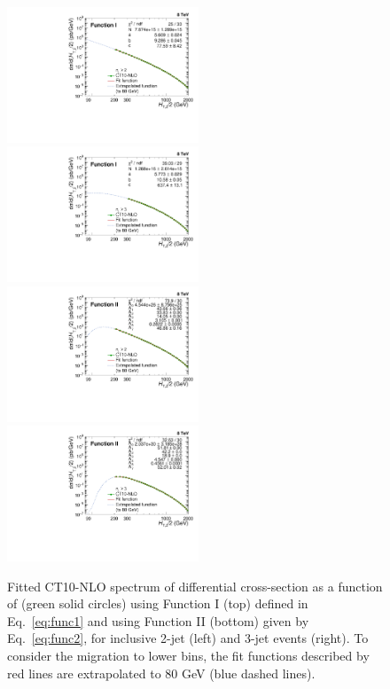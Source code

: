 \begin{figure}[ht]
  \begin{center}
    \hspace*{-5mm}\includegraphics[width=0.51\textwidth]{Plots_HT_2_150/Extrapolate_Theory_2_HT_2_150_funcI.pdf}%
    ~~\includegraphics[width=0.51\textwidth]{Plots_HT_2_150/Extrapolate_Theory_3_HT_2_150_funcI.pdf}\\
    \vspace{5mm}
    \hspace*{-5mm}\includegraphics[width=0.51\textwidth]{Plots_HT_2_150/Extrapolate_Theory_2_HT_2_150_funcII.pdf}%
    ~~\includegraphics[width=0.51\textwidth]{Plots_HT_2_150/Extrapolate_Theory_3_HT_2_150_funcII.pdf}
    \caption[Fitted CT10-NLO spectrum of differential cross-section as a function of \httwo.]{Fitted CT10-NLO spectrum of differential cross-section as a function of \httwo (green solid circles) using Function I (top) defined in Eq.~\ref{eq:func1} and using Function II (bottom) given by Eq.~\ref{eq:func2}, for inclusive 2-jet (left) and 3-jet events (right). To consider the migration to lower \httwo bins, the fit functions described by red lines are extrapolated to 80 GeV (blue dashed lines).}
    \label{fig:fit}
  \end{center}
\end{figure}

